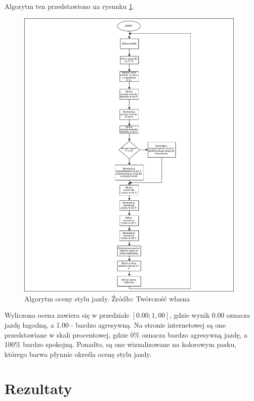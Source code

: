 Algorytm ten przedstawiono na rysunku \ref{fig:image_driving_analysis_alghoritm}.

\begin{figure}[H]
	\centering
	\includegraphics[width=15cm]{img/driving_analysis/driving_analysis.png}
	\caption{Algorytm oceny stylu jazdy. Źródło: Twórczość własna}
	\label{fig:image_driving_analysis_alghoritm}
\end{figure}

Wyliczona ocena zawiera się w przedziale $[0.00; 1,00]$, gdzie wynik 0.00 oznacza jazdę łagodną, a 1.00 - bardzo agresywną. Na stronie internetowej są one przedstawiane w skali procentowej, gdzie 0\% oznacza bardzo agresywną jazdę, a 100\% bardzo spokojną. Ponadto, są one wizualizowane na kolorowym pasku, którego barwa płynnie określa ocenę stylu jazdy.

\section{Rezultaty}

